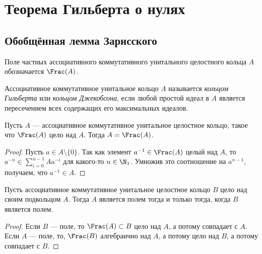 \documentclass[
	extrafontsizes,
	11pt,
	hyphens,
]{memoir}
\begin{document}
\section{Теорема Гильберта о нулях}

\subsection{Обобщённая лемма Зарисского}

\begin{notation}
Поле частных ассоциативного коммутативного унитального целостного кольца \(A\) обозначается \(\Frac(A)\).
\end{notation}

\begin{definition}
Ассоциативное коммутативное унитальное кольцо \(A\) называется \emph{кольцом Гильберта} или \emph{кольцом Джекобсона}, если любой простой идеал в \(A\) является пересечением всех содержащих его максимальных идеалов.
\end{definition}

\begin{theorem}
Пусть \(A\) --- ассоциативное коммутативное унитальное целостное кольцо, такое что \(\Frac(A)\) цело над \(A\).
Тогда \(A = \Frac(A)\).
\end{theorem}

\begin{proof}
Пусть \(a \in A \setminus \{0\}\).
Так как элемент \(a^{-1} \in \Frac(A)\) целый над \(A\), то \(a^{-n} \in \sum_{i=0}^{n-1} A a^{-i}\) для какого-то \(n \in \N_1\).
Умножив это соотношение на \(a^{n-1}\), получаем, что \(a^{-1} \in A\).
\end{proof}

\begin{theorem}
Пусть ассоциативное коммутативное унитальное целостное кольцо \(B\) цело над своим подкольцом \(A\).
\label{thm:hilbert_1}
Тогда \(A\) является полем тогда и только тогда, когда \(B\) является полем.
\end{theorem}

\begin{proof}
Если \(B\) --- поле, то \(\Frac(A) \subset B\) цело над \(A\), а потому совпадает с \(A\).
Если \(A\) --- поле, то, \(\Frac(B)\) алгебраично над \(A\), а потому цело над \(B\), а потому совпадает с \(B\).
\end{proof}
\end{document}
